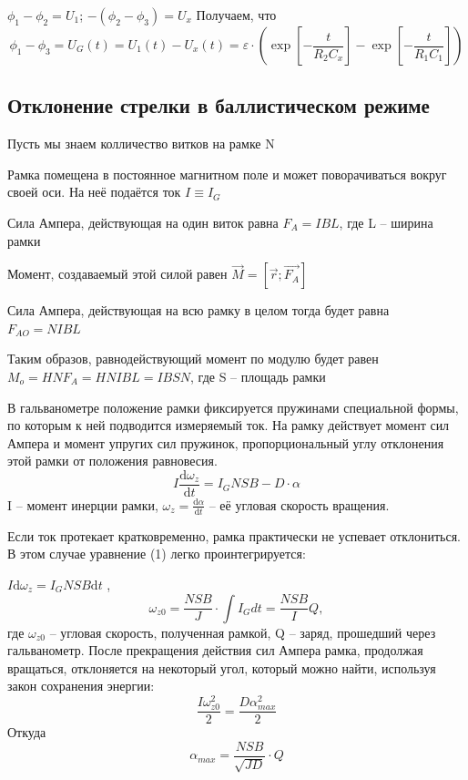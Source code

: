 \documentclass[a4paper,12pt]{extarticle}
\begin{document}
$\phi_1-\phi_2=U_1$; $-(\phi_2-\phi_3)=U_x$
Получаем, что
\begin{equation}
 \phi_1-\phi_3 =U_G(t)=U_1(t)-U_x(t)= \varepsilon \cdot 
	\left( 
		\exp\left[		
			-\frac{t}{R_2 C_x}
		\right]
		-
		\exp\left[		
			-\frac{t}{R_1 C_1}
		\right]
 	\right)
\end{equation}


\subsection{Отклонение стрелки в баллистическом режиме}

Пусть мы знаем колличество витков на рамке N

Рамка помещена в постоянное магнитном поле и может поворачиваться вокруг своей оси. На неё подаётся ток $I\equiv I_G$

Сила Ампера, действующая на один виток равна $F_A=I B L$, где L -- ширина рамки

Момент, создаваемый этой силой равен $ \overrightarrow{M}=\left[ \overrightarrow{r};\overrightarrow{F_A} \right]$

Сила Ампера, действующая на всю рамку в целом тогда будет равна $F_{AO}=NIBL$

Таким образов, равнодействующий момент по модулю будет равен $M_o=HNF_A=HNIBL=IBSN$, где S -- площадь рамки

В гальванометре положение рамки фиксируется пружинами специальной формы, по которым к ней подводится измеряемый ток. На рамку действует момент сил Ампера и момент упругих сил пружинок, пропорциональный углу отклонения этой рамки от положения равновесия.
\begin{equation}
I \frac{\mathrm{d}\omega_z }{\mathrm{d} t}= I_GNSB- D \cdot \alpha
\end{equation}
I -- момент инерции рамки, $\omega_z=\frac{\mathrm{d}\alpha }{\mathrm{d} t}$ -- её угловая скорость вращения.

Если ток протекает кратковременно, рамка практически не успевает отклониться. В этом случае уравнение (1) легко проинтегрируется:

$ I \mathrm{d} \omega_z =  I_GNSB\mathrm{d} t$ ,  
\begin{equation}
\omega_{z0}=\frac{NSB}{J} \cdot \int I_G dt= \frac{NSB}{I}Q ,
\end{equation} 
  где $ \omega_{z0}$ -- угловая скорость, полученная рамкой, Q -- заряд, прошедший через гальванометр. После прекращения действия сил Ампера рамка, продолжая вращаться, отклоняется на некоторый угол, который можно найти, используя закон сохранения энергии:
  \begin{equation}
  \frac{I\omega_{z0}^2}{2}= \frac{D\alpha^2_{max}}{2}
   \end{equation}
Откуда
  \begin{equation}
\alpha_{max}=\frac{NSB}{\sqrt{JD}}\cdot Q 
  \end{equation}
\end{document}
